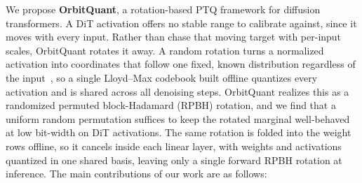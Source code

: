 
We propose \textbf{OrbitQuant}, a rotation-based PTQ framework for diffusion transformers. A DiT activation offers no stable range to calibrate against, since it moves with every input. Rather than chase that moving target with per-input scales, OrbitQuant rotates it away. A random rotation turns a normalized activation into coordinates that follow one fixed, known distribution regardless of the input~\cite{zandieh2025turboquant}, so a single Lloyd--Max codebook built offline quantizes every activation and is shared across all denoising steps. OrbitQuant realizes this as a randomized permuted block-Hadamard (RPBH) rotation, and we find that a uniform random permutation suffices to keep the rotated marginal well-behaved at low bit-width on DiT activations. The same rotation is folded into the weight rows offline, so it cancels inside each linear layer, with weights and activations quantized in one shared basis, leaving only a single forward RPBH rotation at inference. The main contributions of our work are as follows:

